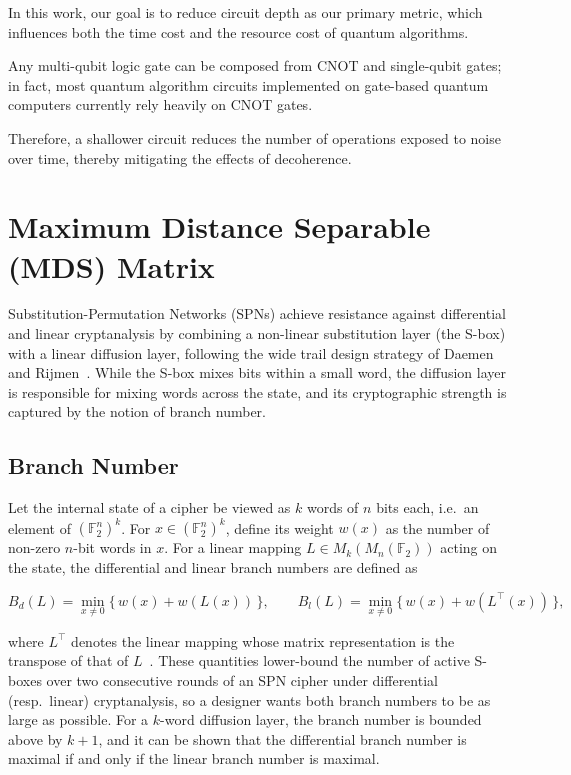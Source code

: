 In this work, our goal is to reduce circuit depth as our primary metric, which influences both the time cost and the resource cost of quantum algorithms.

Any multi-qubit logic gate can be composed from CNOT and single-qubit gates; in fact, most quantum algorithm circuits implemented on gate-based quantum computers currently rely heavily on CNOT gates.

Therefore, a shallower circuit reduces the number of operations exposed to noise over time, thereby mitigating the effects of decoherence.

\section{Maximum Distance Separable (MDS) Matrix}
\label{sec:mds}

Substitution-Permutation Networks (SPNs) achieve resistance against differential
and linear cryptanalysis by combining a non-linear substitution layer (the S-box)
with a linear diffusion layer, following the wide trail design strategy of Daemen
and Rijmen~\cite{daemen2001wide}. While the S-box mixes bits within a small word, the
diffusion layer is responsible for mixing words across the state, and its
cryptographic strength is captured by the notion of branch number.

\subsection{Branch Number}

Let the internal state of a cipher be viewed as $k$ words of $n$ bits each, i.e.\
an element of $(\mathbb{F}_2^n)^k$. For $x \in (\mathbb{F}_2^n)^k$, define its
weight $w(x)$ as the number of non-zero $n$-bit words in $x$. For a linear
mapping $L \in M_k(M_n(\mathbb{F}_2))$ acting on the state, the differential
and linear branch numbers are defined as

\begin{equation}
B_d(L) = \min_{x \neq 0} \{\, w(x) + w(L(x)) \,\}, \qquad
B_l(L) = \min_{x \neq 0} \{\, w(x) + w(L^{\top}(x)) \,\},
\end{equation}

where $L^{\top}$ denotes the linear mapping whose matrix representation is the
transpose of that of $L$~\cite{daemen2001wide}. These quantities lower-bound the number of
active S-boxes over two consecutive rounds of an SPN cipher under differential
(resp.\ linear) cryptanalysis, so a designer wants both branch numbers to be as
large as possible. For a $k$-word diffusion layer, the branch number is bounded
above by $k+1$, and it can be shown that the differential branch number is
maximal if and only if the linear branch number is maximal.

